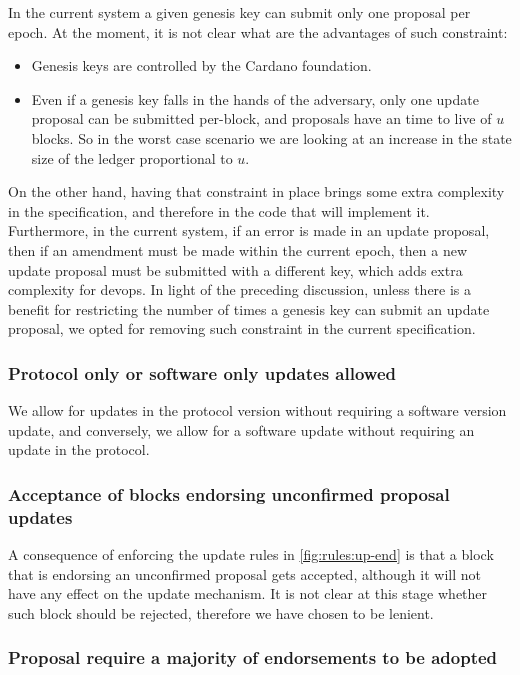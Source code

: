 In the current system a given genesis key can submit only one proposal per
epoch. At the moment, it is not clear what are the advantages of such
constraint:
\begin{itemize}
\item Genesis keys are controlled by the Cardano foundation.
\item Even if a genesis key falls in the hands of the adversary, only one
  update proposal can be submitted per-block, and proposals have an time to
  live of $u$ blocks. So in the worst case scenario we are looking at an
  increase in the state size of the ledger proportional to $u$.
\end{itemize}
On the other hand, having that constraint in place brings some extra complexity
in the specification, and therefore in the code that will implement it.
Furthermore, in the current system, if an error is made in an update proposal,
then if an amendment must be made within the current epoch, then a new update
proposal must be submitted with a different key, which adds extra complexity
for devops. In light of the preceding discussion, unless there is a benefit for
restricting the number of times a genesis key can submit an update proposal, we
opted for removing such constraint in the current specification.

\subsubsection{Protocol only or software only updates allowed}
\label{sec:ptonly-or-swonly-allowed}

We allow for updates in the protocol version without requiring a software
version update, and conversely, we allow for a software update without
requiring an update in the protocol.

\subsubsection{Acceptance of blocks endorsing unconfirmed proposal updates}
\label{sec:acceptance-of-uncofirmed-up-endorsements}

A consequence of enforcing the update rules in \cref{fig:rules:up-end} is that
a block that is endorsing an unconfirmed proposal gets accepted, although it
will not have any effect on the update mechanism. It is not clear at this stage
whether such block should be rejected, therefore we have chosen to be lenient.

\subsubsection{Proposal require a majority of endorsements to be adopted}
\label{sec:up-adoption-with-majority}

